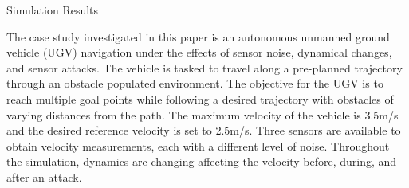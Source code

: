 
\begin{section}{Simulation Results}
\label{sec:simulation}


The case study investigated in this paper is an autonomous unmanned ground vehicle (UGV) navigation under the effects of sensor noise, dynamical changes, and sensor attacks. The vehicle is tasked to travel along a pre-planned trajectory through an obstacle populated environment. 
The objective for the UGV is to reach multiple goal points while following a desired trajectory with obstacles of varying distances from the path. The maximum velocity of the vehicle is 3.5m/s and the desired reference velocity is set to 2.5m/s. Three sensors are available to obtain velocity measurements, each with a different level of noise. Throughout the simulation, dynamics are changing affecting the velocity before, during, and after an attack. 




\begin{figure}[b!th]
\begin{tabular}{ccc}


\end{tabular}
\end{figure}
\end{section}
